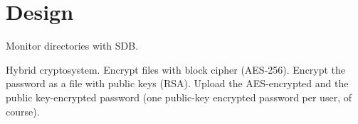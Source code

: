 \section{Design}

Monitor directories with SDB.

Hybrid cryptosystem. Encrypt files with block cipher
(AES-256). Encrypt the password as a file with public keys (RSA).
Upload the AES-encrypted and the public key-encrypted password (one
public-key encrypted password per user, of course).




